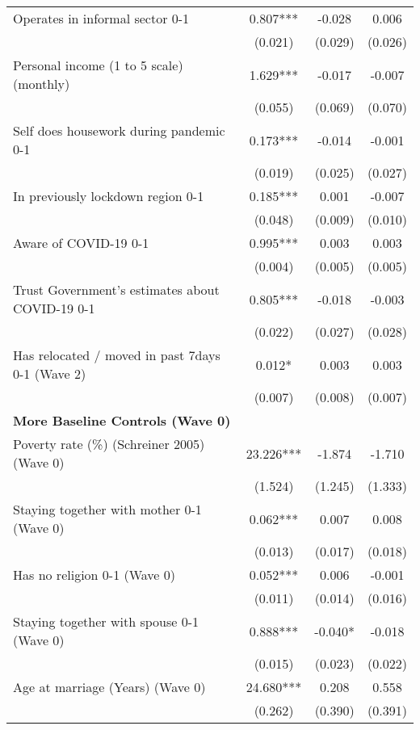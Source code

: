 \begin{ThreePartTable}
\begin{table}[tbp]
\begin{tabular}{lccc}
 Operates in informal sector 0-1 & 0.807*** & -0.028 & 0.006 \\ [0.1em] 
                   &      (0.021)     &      (0.029)     &      (0.026)     \\ [0.1em] 
 Personal income (1 to 5 scale) (monthly) & 1.629*** & -0.017 & -0.007 \\ [0.1em] 
                   &      (0.055)     &      (0.069)     &      (0.070)     \\ [0.1em] 
 Self does housework during pandemic 0-1 & 0.173*** & -0.014 & -0.001 \\ [0.1em] 
                   &      (0.019)     &      (0.025)     &      (0.027)     \\ [0.1em] 
 In previously lockdown region 0-1 & 0.185*** & 0.001 & -0.007 \\ [0.1em] 
                   &      (0.048)     &      (0.009)     &      (0.010)     \\ [0.1em] 
 Aware of COVID-19 0-1 & 0.995*** & 0.003 & 0.003 \\ [0.1em] 
                   &      (0.004)     &      (0.005)     &      (0.005)     \\ [0.1em] 
 Trust Government's estimates about COVID-19 0-1 & 0.805*** & -0.018 & -0.003 \\ [0.1em] 
                   &      (0.022)     &      (0.027)     &      (0.028)     \\ [0.1em] 
 Has relocated / moved in past 7days 0-1 (Wave 2) & 0.012* & 0.003 & 0.003 \\ [0.1em] 
                   &      (0.007)     &      (0.008)     &      (0.007)     \\ [0.1em] 
\textbf{More Baseline Controls (Wave 0)} & & & \\ 
 Poverty rate (\%) (Schreiner 2005) (Wave 0) & 23.226*** & -1.874 & -1.710 \\ [0.1em] 
                   &      (1.524)     &      (1.245)     &      (1.333)     \\ [0.1em] 
 Staying together with mother 0-1 (Wave 0) & 0.062*** & 0.007 & 0.008 \\ [0.1em] 
                   &      (0.013)     &      (0.017)     &      (0.018)     \\ [0.1em] 
 Has no religion 0-1 (Wave 0) & 0.052*** & 0.006 & -0.001 \\ [0.1em] 
                   &      (0.011)     &      (0.014)     &      (0.016)     \\ [0.1em] 
 Staying together with spouse 0-1 (Wave 0) & 0.888*** & -0.040* & -0.018 \\ [0.1em] 
                   &      (0.015)     &      (0.023)     &      (0.022)     \\ [0.1em] 
 Age at marriage (Years) (Wave 0) & 24.680*** & 0.208 & 0.558 \\ [0.1em] 
                   &      (0.262)     &      (0.390)     &      (0.391)     \\ [0.1em] 
\hline\hline
\end{tabular}
\insertTableNotes
\end{table}
\end{ThreePartTable}
